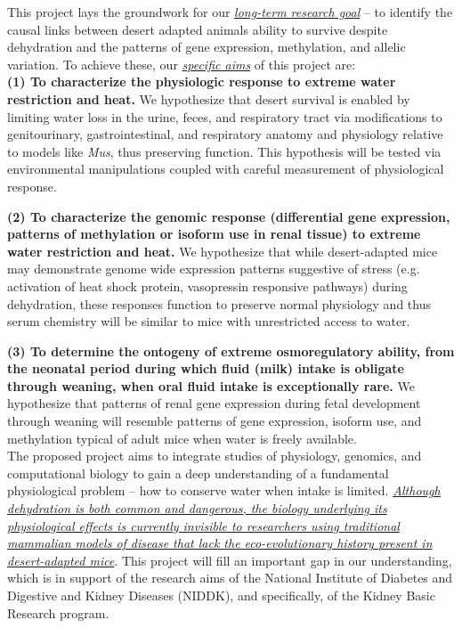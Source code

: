 This project lays the groundwork for our \ul{\emph{long-term research goal}} – to identify the causal links between desert adapted animals ability to survive despite dehydration and the patterns of gene expression, methylation, and allelic variation. To achieve these, our \ul{\emph{specific aims}} of this project are: \\

\noindent \textbf{(1) To characterize the physiologic response to extreme water restriction and heat.} We hypothesize that desert survival is enabled by limiting water loss in the urine, feces, and respiratory tract via modifications to genitourinary, gastrointestinal, and respiratory anatomy and physiology relative to models like \textit{Mus}, thus preserving function. This hypothesis will be tested via environmental manipulations coupled with careful measurement of physiological response.

\noindent \textbf{(2) To characterize the genomic response (differential gene expression, patterns of methylation or isoform use in renal tissue) to extreme water restriction and heat.} We hypothesize that while desert-adapted mice may demonstrate genome wide expression patterns suggestive of stress (e.g. activation of heat shock protein, vasopressin responsive pathways) during dehydration, these responses function to preserve normal physiology and thus serum chemistry will be similar to mice with unrestricted access to water.

\noindent \textbf{(3) To determine the ontogeny of extreme osmoregulatory ability, from the neonatal period during which fluid (milk) intake is obligate through weaning, when oral fluid intake is exceptionally rare. } We hypothesize that patterns of renal gene expression during fetal development through weaning will resemble patterns of gene expression, isoform use, and methylation typical of adult mice when water is freely available. \\


\noindent The proposed project aims to integrate studies of physiology, genomics, and computational biology to gain a deep understanding of a fundamental physiological problem – how to conserve water when intake is limited. \ul{\emph{Although dehydration is both common and dangerous, the biology underlying its physiological effects is currently invisible to researchers using traditional mammalian models of disease that lack the eco-evolutionary history present in desert-adapted mice}}. This project will fill an important gap in our understanding, which is in support of the research aims of the National Institute of Diabetes and Digestive and Kidney Diseases (NIDDK), and specifically, of the Kidney Basic Research program.
%
























